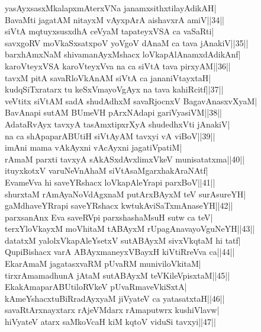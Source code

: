 \documentclass{article}
\begin{document}
yasAyxsasxMkalapxmAterxVNa janamxsithxtilayAdikAH|\\
BavaMti jagatAM nitayxM vAyxpArA aishavxrA amiV||34||\\
siVtA mqtuyxsusxdhA ceVyaM tapateyxVSA ca vaSaRti|\\
savxgoRV moVkaSxsatxpoV yoVgoV dAnaM ca tava jAnakiV||35||\\
barxhAmxNaM shivamanAyxMshacx loVkapAlAnamxdAdikAnf|\\
karoVteyxVSA karoVteyxVva na ca siVtA tava pirxyAM||36||\\
tavxM pitA savaRloVkAnAM siVtA ca jananiVtayxtaH|\\
kudqSiTxratarx tu keSxVmayoVgAyx na tava kahiRcitf||37||\\
veVtitx siVtAM sadA shudAdhxM savaRjocnxV BagavAnasxvXyaM|\\
BavAnapi sutAM BUmeVH pArxNAdapi gariVyasiVM||38||\\
AdataRvAyx tavxyA tasAmxtipxrXyA shudedhxVti jAnakiV|\\
na ca shApaparABUtiH siVtAyAM tavxyi vA viBoV||39||\\
imAni mama vAkAyxni vAcAyxni jagatiVpatiM|\\
rAmaM parxti tavxyA sAkASxdAvxlimxVkeV munisatatxma||40||\\
ituyxkotxV varuNeVnAhaM siVtAsaMgarxhakAraNAtf|\\
EvameVva hi saveYRshacx loVkapAleYrapi parxBoV||41||\\
shurxtaM rAmAyaNoVdAgxnaM putArxBAyxM teV surAsureYH|\\
gaMdhaveYRrapi saveYRshacx kwtukAviSaTxmAnaseYH||42||\\
parxsanAnx Eva saveRVpi parxshashaMsuH sutw ca teV|\\
terxYloVkayxM moVhitaM tABAyxM rUpagAnavayoVguNeYH||43||\\
datatxM yalolxVkapAleYsetxV sutABAyxM sivxVkqtaM hi tatf|\\
QupiBishacx varA ABAyxmaneyxVBayxH kiVtiRreVva ca||44||\\
EkarAmaM jagatasxvaRM pUvaRM muniviloVkitaM|\\
tirxrAmamadhunA jAtaM sutABAyxM teVKileVpisxtaM||45||\\
EkakAmaparABUtiloRVkeV pUvaRmaveVkiSxtA|\\
kAmeYshacxtuBiRradAyxyaM jiVyateV ca yatasatxtaH||46||\\
savaRtArxnayxtarx rAjeVMdarx rAmaputwrx kushiVlavw|\\
hiVyateV atarx saMkoVcaH kiM kqtoV viduSi tavxyi||47||\\
\end{document}
